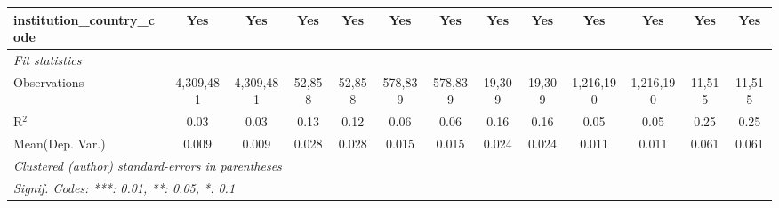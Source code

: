 \begin{tabular}{lcccccccccccc}
   institution\_country\_code               & Yes            & Yes             & Yes            & Yes            & Yes            & Yes             & Yes          & Yes             & Yes            & Yes              & Yes            & Yes\\  
   \midrule
   \emph{Fit statistics}\\
   Observations                             & 4,309,481      & 4,309,481       & 52,858         & 52,858         & 578,839        & 578,839         & 19,309       & 19,309          & 1,216,190      & 1,216,190        & 11,515         & 11,515\\  
   R$^2$                                    & 0.03           & 0.03            & 0.13           & 0.12           & 0.06           & 0.06            & 0.16         & 0.16            & 0.05           & 0.05             & 0.25           & 0.25\\  
Mean(Dep. Var.) & 0.009 & 0.009 & 0.028 & 0.028 & 0.015 & 0.015 & 0.024 & 0.024 & 0.011 & 0.011 & 0.061 & 0.061 \\
   \midrule \midrule
   \multicolumn{13}{l}{\emph{Clustered (author) standard-errors in parentheses}}\\
   \multicolumn{13}{l}{\emph{Signif. Codes: ***: 0.01, **: 0.05, *: 0.1}}\\
\end{tabular}
\par\endgroup
